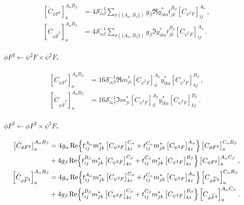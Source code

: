 \begin{align}
    \left[\dot C_{\phi F^2}\right]_{a}^{A_\alpha B_\beta} &= 4 \mathcal S_{\alpha\beta}^{-1} \sum_{\sigma(\{A_\alpha,B_\beta\})}
     g_\beta \Re{
     y^*_{ika}t^{B_\beta}_{jk}
    \left[C_{\psi^2 F}\right]_{ij}^{A_\alpha}
    }
    \,,\label{phiF2_psi2F}
    \\
    \left[\dot C_{\phi \widetilde F^2}\right]_{a}^{A_\alpha B_\beta} &= 4 \mathcal S_{\alpha\beta}^{-1} \sum_{\sigma(\{A_\alpha,B_\beta\})}
     g_\beta \Im{
     y^*_{ika}t^{B_\beta}_{jk}
    \left[C_{\psi^2 F}\right]_{ij}^{A_\alpha}
    }
    \,.\label{phiFtilde2_psi2F}
\end{align}

\paragraph{$\phi F^2\leftarrow \psi^2 F \times \psi^2 F$.}

\begin{align}
    \left[\dot C_{\phi F^2}\right]_{a}^{A_\alpha B_\beta} &= 16 \mathcal S_{\alpha\beta}^{-1} \Re{m^*_{ji} \left[C_{\psi^2 F}\right]_{il}^{A_\alpha} y^*_{lka} \left[C_{\psi^2 F}\right]_{kj}^{B_\beta}} \,,\label{phiF2_psi2Fxpsi2F}
    \\
    \left[\dot C_{\phi \widetilde F^2}\right]_{a}^{A_\alpha B_\beta} &= 16 \mathcal S_{\alpha\beta}^{-1} \Im{m^*_{ji} \left[C_{\psi^2 F}\right]_{il}^{A_\alpha} y^*_{lka} \left[C_{\psi^2 F}\right]_{kj}^{B_\beta}} \,.\label{phiFtilde2_psi2Fxpsi2F}
\end{align}

\paragraph{$\phi F^2 \leftarrow \phi F^2 \times \psi^2 F$.}

\begin{align}
    \left[\dot C_{\phi F^2}\right]_{a}^{A_\alpha B_\beta} &= 4g_\alpha \Re{t^{A_\alpha}_{ij}m^*_{jk}\left[C_{\psi^2 F}\right]^{C_\alpha}_{ki} + t^{C_\alpha}_{ij}m^*_{jk}\left[C_{\psi^2 F}\right]^{A_\alpha}_{ki} }\left[C_{\phi F^2}\right]_a^{C_\alpha B_\beta} \nonumber \\
    &+ 
    4g_\beta \Re{t^{B_\beta}_{ij}m^*_{jk}\left[C_{\psi^2 F}\right]^{C_\beta}_{ki} + t^{C_\beta}_{ij}m^*_{jk}\left[C_{\psi^2 F}\right]^{B_\beta}_{ki} }\left[C_{\phi F^2}\right]_a^{A_\alpha C_\beta}
    \,,
    \\
    \left[\dot C_{\phi \widetilde{F}^2}\right]_{a}^{A_\alpha B_\beta} &= 4g_\alpha \Re{t^{A_\alpha}_{ij}m^*_{jk}\left[C_{\psi^2 F}\right]^{C_\alpha}_{ki} + t^{C_\alpha}_{ij}m^*_{jk}\left[C_{\psi^2 F}\right]^{A_\alpha}_{ki} }\left[C_{\phi \widetilde{F}^2}\right]_a^{C_\alpha B_\beta} \nonumber \\
    &+ 
    4g_\beta \Re{t^{B_\beta}_{ij}m^*_{jk}\left[C_{\psi^2 F}\right]^{C_\beta}_{ki} + t^{C_\beta}_{ij}m^*_{jk}\left[C_{\psi^2 F}\right]^{B_\beta}_{ki} }\left[C_{\phi \widetilde{F}^2}\right]_a^{A_\alpha C_\beta}\,.
\end{align}

